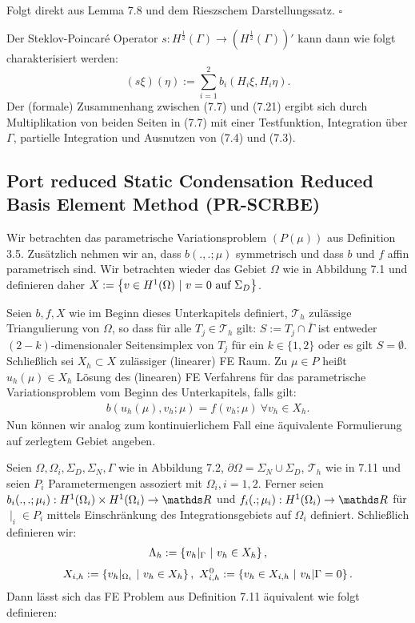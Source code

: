 \\
Folgt direkt aus Lemma 7.8 und dem Rieszschem Darstellungssatz.
\hfill $\square$

Der Steklov-Poincaré Operator $s:H^{\frac{1}{2}}(\Gamma) \to (H^{\frac{1}{2}}(\Gamma))'$ kann dann wie folgt charakterisiert werden:
\[
(s\xi)(\eta) := \sum_{i=1}^2 b_i(H_i\xi,H_i\eta).
\]
Der (formale) Zusammenhang zwischen (7.7) und (7.21) ergibt sich durch Multiplikation von beiden Seiten in (7.7) mit einer Testfunktion, Integration über $\Gamma$, partielle Integration und Ausnutzen von (7.4) und (7.3).

\subsection{Port reduced Static Condensation Reduced Basis Element Method (PR-SCRBE)}
Wir betrachten das parametrische Variationsproblem $(P(\mu))$ aus Definition 3.5.
Zusätzlich nehmen wir an, dass $b(.,.;\mu)$ symmetrisch und dass $b$ und $f$ affin parametrisch sind.
Wir betrachten wieder das Gebiet $\Omega$ wie in Abbildung 7.1 und definieren daher $X:=\left\{v\in H^1(\Omega)~|~v=0 \text{ auf }\Sigma_D\right\}$.

Seien $b,f,X$ wie im Beginn dieses Unterkapitels definiert, $\mathcal{T}_h$ zulässige Triangulierung von $\Omega$, so dass für alle $T_j\in \mathcal{T}_h$ gilt: $S:=T_j\cap \bar{\Gamma}$ ist entweder $(2-k)$-dimensionaler Seitensimplex von $T_j$ für ein $k\in \{1,2\}$ oder es gilt $S=\emptyset$.
Schließlich sei $X_h\subset X$ zulässiger (linearer) FE Raum.
Zu $\mu\in P$ heißt $u_h(\mu)\in X_h$ Lösung des (linearen) FE Verfahrens für das parametrische Variationsproblem vom Beginn des Unterkapitels, falls gilt:
\begin{align}
b(u_h(\mu),v_h;\mu) = f(v_h;\mu) ~ \forall v_h\in X_h.
\end{align}
Nun können wir analog zum kontinuierlichem Fall eine äquivalente Formulierung auf zerlegtem Gebiet angeben.

Seien $\Omega,\Omega_i,\Sigma_D,\Sigma_N,\Gamma$ wie in Abbildung 7.2, $\partial\Omega=\Sigma_N\cup\Sigma_D$, $\mathcal{T}_h$ wie in 7.11 und seien $P_i$ Parametermengen assoziert mit $\Omega_i,i=1,2$.
Ferner seien $b_i(.,.;\mu_i): H^1(\Omega_i)\times H^1(\Omega_i) \to \R$ und $f_i(.;\mu_i):H^1(\Omega_i)\to \R$ für $\mid_i\in P_i$ mittels Einschränkung des Integrationsgebiets auf $\Omega_i$ definiert.
Schließlich definieren wir:
\begin{align}
\Lambda_h := \left\{v_h|_\Gamma~|~v_h\in X_h\right\},
\end{align}
\[
X_{i,h} := \left\{v_h|_{\Omega_i} ~|~v_h\in X_h\right\},~ X_{i,h}^0 := \left\{v_h\in X_{i,h}~|~v_h|\Gamma = 0\right\}.
\]
Dann lässt sich das FE Problem aus Definition 7.11 äquivalent wie folgt definieren:

